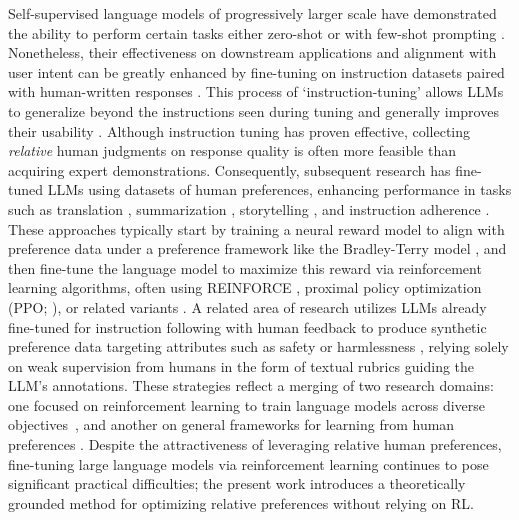 Self-supervised language models of progressively larger scale have demonstrated the ability to perform certain tasks either zero-shot \citep{radford2019language} or with few-shot prompting \citep{gpt3,megatron,chowdhery2022palm}. Nonetheless, their effectiveness on downstream applications and alignment with user intent can be greatly enhanced by fine-tuning on instruction datasets paired with human-written responses \citep{mishra-etal-2022-cross,sanh2022multitask,chung2022scaling,thoppilan2022lamda}. This process of `instruction-tuning' allows LLMs to generalize beyond the instructions seen during tuning and generally improves their usability \citep{chung2022scaling}. Although instruction tuning has proven effective, collecting \textit{relative} human judgments on response quality is often more feasible than acquiring expert demonstrations. Consequently, subsequent research has fine-tuned LLMs using datasets of human preferences, enhancing performance in tasks such as translation \citep{kreutzer-etal-2018-reliability}, summarization \citep{stiennon2022learning,ziegler2020finetuning}, storytelling \citep{ziegler2020finetuning}, and instruction adherence \citep{ouyang2022training,ramamurthy2023is}. These approaches typically start by training a neural reward model to align with preference data under a preference framework like the Bradley-Terry model \citep{bradley1952rankanalysis}, and then fine-tune the language model to maximize this reward via reinforcement learning algorithms, often using REINFORCE \citep{williams1992reinforce}, proximal policy optimization (PPO; \cite{schulman2017proximal}), or related variants \citep{ramamurthy2023is}. A related area of research utilizes LLMs already fine-tuned for instruction following with human feedback to produce synthetic preference data targeting attributes such as safety or harmlessness \citep{bai2022constitutional}, relying solely on weak supervision from humans in the form of textual rubrics guiding the LLM’s annotations. These strategies reflect a merging of two research domains: one focused on reinforcement learning to train language models across diverse objectives~\citep{Ranzato2015SequenceLT,paulus2018a,wu2018learning}, and another on general frameworks for learning from human preferences \citep{christiano2017deep,kupcsik2018learning}. Despite the attractiveness of leveraging relative human preferences, fine-tuning large language models via reinforcement learning continues to pose significant practical difficulties; the present work introduces a theoretically grounded method for optimizing relative preferences without relying on RL.

